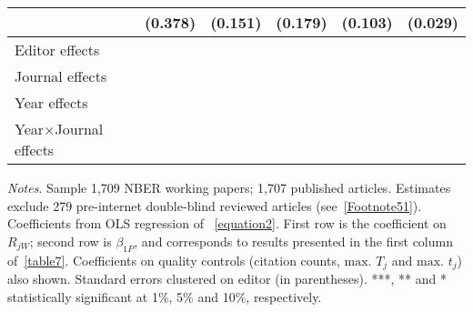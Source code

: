 \begin{table}[H]
\begin{threeparttable}
\begin{tabular}{p{3cm}S@{}S@{}S@{}S@{}S@{}}
                                          &     (0.378)   &     (0.151)   &     (0.179)   &     (0.103)   &     (0.029)   \\
            \midrule
            Editor effects                &           {}   &           {}   &           {}   &           {}   &           {}   \\
            Journal effects               &           {}   &           {}   &           {}   &           {}   &           {}   \\
            Year effects                  &           {}   &           {}   &           {}   &           {}   &           {}   \\
            Year\(\times\)Journal effects          &           {}   &           {}   &           {}   &           {}   &           {}   \\
            \bottomrule
        \end{tabular}
        \begin{tablenotes}
            \tiny
            \item \textit{Notes}. Sample 1,709 NBER working papers; 1,707 published articles. Estimates exclude 279 pre-internet double-blind reviewed articles (see~\autoref{Footnote51}). Coefficients from OLS regression of ~\autoref{equation2}. First row is the coefficient on \(R_{jW}\); second row is \(\beta_{1P}\), and corresponds to results presented in the first column of~\autoref{table7}. Coefficients on quality controls (citation counts, \(\text{max. }T_j\) and \(\text{max. }t_j\)) also shown. Standard errors clustered on editor (in parentheses). ***, ** and * statistically significant at 1\%, 5\% and 10\%, respectively.
        \end{tablenotes}
    \end{threeparttable}
\end{table}